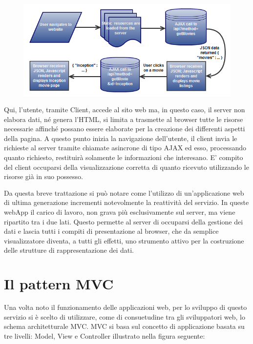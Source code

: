 \begin{figure}[htbp]
\begin{center}
\includegraphics{contents/images/web_app_flow_3_1_}
\end{center}
\caption{}
\label{fig:flow_1}
\end{figure}

Qui, l’utente, tramite Client, accede al sito web ma, in questo caso, il server non elabora dati, né genera l’HTML, si limita a trasmette al browser tutte le risorse necessarie affinché possano essere elaborate per la creazione dei differenti aspetti della pagina. A questo punto inizia la navigazione dell’utente, il client invia le richieste al server tramite chiamate asincrone di tipo AJAX ed esso, processando quanto richiesto, restituirà solamente le informazioni che interesano. E’ compito del client occuparsi della visualizzazione corretta di quanto ricevuto utilizzando le risorse già in suo possesso.

Da questa breve trattazione si può notare come l’utilizzo di un’applicazione web di ultima generazione incrementi notevolmente la reattività del servizio. In queste webApp il carico di lavoro, non grava più esclusivamente sul server, ma viene ripartito tra i due lati. Questo permette al server di occuparsi della gestione dei dati e lascia tutti i compiti di presentazione al browser, che da semplice visualizzatore diventa, a tutti gli effetti, uno strumento attivo per la costruzione delle strutture di rappresentazione dei dati.

\newpage

\section{Il pattern MVC} %
\label{sec:il_pattern_mvc}

Una volta noto il funzionamento delle applicazioni web, per lo sviluppo di questo servizio si è scelto di utilizzare, come di consuetudine tra gli sviluppatori web, lo schema architetturale MVC.
MVC si basa sul concetto di applicazione basata su tre livelli: Model, View e Controller illustrato nella figura seguente:

